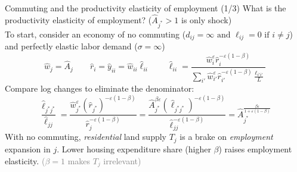 \documentclass[11pt,notes=hide,aspectratio=169]{beamer}
\begin{document}
\begin{frame}{Commuting and the productivity elasticity of employment (1/3)}
What is the productivity elasticity of employment? ($\hat{A}_{j^{*}} > 1$ is only shock) \\
To start, consider an economy of no commuting ($d_{ij} = \infty \text{ and } \ell_{ij} = 0 \text{ if } i \neq j$) and perfectly elastic labor demand ($\sigma = \infty$)
\begin{equation*}
\hat{w}_{j}
=
\hat{A}_j
\qquad
\hat{r}_{i}
=
\hat{y}_{ii}
=
\hat{w}_{ii} \hat{\ell}_{ii}
\qquad
\hat{\ell}_{ii} 
=
\frac{\hat{w}_{i}^{\varepsilon}\hat{r}_{i}^{-\varepsilon(1-\beta)}}{\sum_{i'} \hat{w}_{i'}^{\varepsilon} \hat{r}_{i'}^{-\varepsilon(1-\beta)} \frac{\ell_{i'i'}}{L}}
\end{equation*}
Compare log changes to eliminate the denominator:
\begin{equation*}
\frac{\hat{\ell}_{j^{*}j^{*}}}{\hat{\ell}_{jj}}
=
\frac{\hat{w}_{j^{*}}^{\varepsilon}\left(\hat{r}_{j^{*}}\right)^{-\varepsilon(1-\beta)}}%
{\hat{r}_{j}^{-\varepsilon(1-\beta)}}
=
\frac{\hat{A}_{j^{*}}^{\beta\varepsilon}\left(\hat{\ell}_{j^{*}j^{*}}\right)^{-\varepsilon(1-\beta)}}%
{\hat{\ell}_{jj}^{-\varepsilon(1-\beta)}}
=
\hat{A}_{j^{*}}^{\frac{\beta\varepsilon}{1+\varepsilon(1-\beta)}}
\end{equation*}
With no commuting, \textit{residential} land supply $T_j$ is a brake on \textit{employment} expansion in $j$.
Lower housing expenditure share (higher $\beta$) raises employment elasticity.
\textcolor{gray}{($\beta = 1$ makes $T_j$ irrelevant)}
\end{frame}
\end{document}
